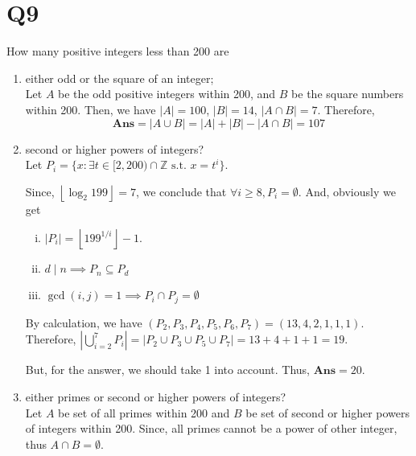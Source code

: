 \documentclass[a4paper,11pt]{article}
\newenvironment{qparts}{\begin{enumerate}[{(}a{)}]}{\end{enumerate}}
\begin{document}
\section*{Q9}
How many positive integers less than 200 are
\begin{qparts}
    
    \item either odd or the square of an integer;\\
    Let $A$ be the odd positive integers within 200, and 
    $B$ be the square numbers within 200.
    Then, we have $\left\vert A  \right\vert =100$, 
    $\left\vert B \right\vert = 14$, $\left\vert A \cap B \right\vert=7 $. Therefore, 
    \begin{equation*}
        \textbf{Ans}=\left\vert A \cup B  \right\vert
            = \left\vert  A\right\vert +\left\vert B  \right\vert -\left\vert A \cap B \right\vert=107
    \end{equation*}


    \item second or higher powers of integers?\\
    Let $P_{i}=\{ x\colon  \exists t \in [2,200) \cap \mathbb{Z} \text{ s.t. } x=t^{i} \}$.  

    Since, $\left\lfloor \log_2 199 \right\rfloor=7$, we conclude that 
    $\forall i \ge 8, P_{i }=\emptyset$. And, obviously we get
    \begin{enumerate}[i. ]
        
        \item $\left\vert P_{i } \right\vert =\left\lfloor 199^{1 / i} \right\rfloor-1$. 
        \item $d \mid n \implies P_{n} \subseteq P_{d}$
        \item $\operatorname{gcd}(i,j)=1 \implies P_{i }\cap P_{j }=\emptyset$
    \end{enumerate}
    By calculation, we have $(P_2,P_3,P_4,P_5,P_6,P_7)=(13,4,2,1,1,1)$. 
    Therefore, $\left\vert \bigcup_{i=2}^{7}P_{i } \right\vert =\left\vert P_{2} \cup P_{3} \cup P_{5} \cup P_7 \right\vert =13+4+1+1=19$.

    But, for the answer, we should take 1 into account. Thus, $\textbf{Ans}=20$.


    \item  either primes or second or higher powers of integers?\\
    Let $A$ be set of all primes within 200 
    and $B$ be set of second or higher powers of integers within 200.
    Since, all primes cannot be a power of other integer, thus $A \cap B=\emptyset$.


\end{qparts}
\end{document}
